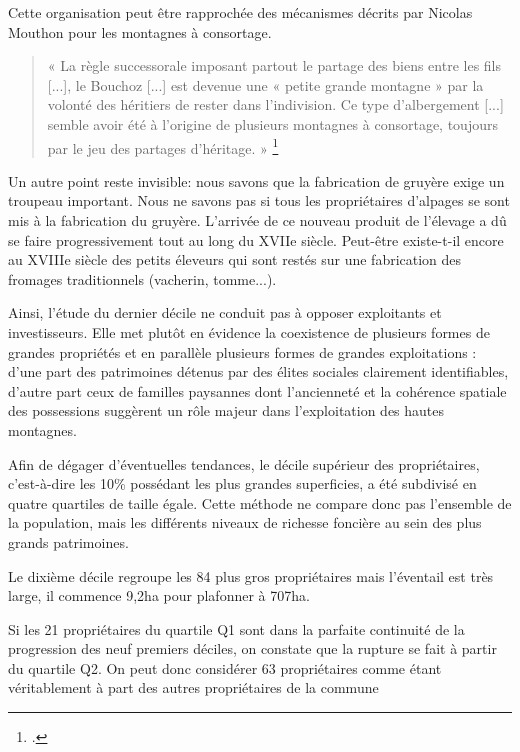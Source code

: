 \documentclass[12pt,a4paper]{report}
\begin{document}
	Cette organisation peut être rapprochée des mécanismes décrits par Nicolas Mouthon pour les montagnes à consortage.
	
	\begin{quote}
		« La règle successorale imposant partout le partage des biens entre les fils [...], le Bouchoz [...] est devenue une « petite grande montagne » par la volonté des héritiers de rester dans l'indivision. Ce type d'albergement [...] semble avoir été à l'origine de plusieurs montagnes à consortage, toujours par le jeu des partages d'héritage. »
		\footcite[120]{Mouthon2019MontagnesMedievales}
	\end{quote}
	
	
	\medskip
	Un autre point reste invisible: nous savons que la fabrication de gruyère exige un troupeau important. Nous ne savons pas si tous les propriétaires d'alpages se sont mis à la fabrication du gruyère. L'arrivée de ce nouveau produit de l'élevage a dû se faire progressivement tout au long du XVIIe siècle. Peut-être existe-t-il encore au XVIIIe siècle des petits éleveurs qui sont restés sur une fabrication des fromages traditionnels (vacherin, tomme...).
	
	\medskip
	Ainsi, l'étude du dernier décile ne conduit pas à opposer exploitants et investisseurs. Elle met plutôt en évidence la coexistence de plusieurs formes de grandes propriétés et en parallèle plusieurs formes de grandes exploitations : d'une part des patrimoines détenus par des élites sociales clairement identifiables, d'autre part ceux de familles paysannes dont l'ancienneté et la cohérence spatiale des possessions suggèrent un rôle majeur dans l'exploitation des hautes montagnes.
	
	\medskip
	Afin de dégager d'éventuelles tendances, le décile supérieur des propriétaires, c'est-à-dire les 10\% possédant les plus grandes superficies, a été subdivisé en quatre quartiles de taille égale. Cette méthode ne compare donc pas l'ensemble de la population, mais les différents niveaux de richesse foncière au sein des plus grands patrimoines. 
	
	\vspace{1em}
	
	Le dixième décile regroupe les 84 plus gros propriétaires mais l'éventail est très large, il commence 9,2ha pour plafonner à 707ha.
	
	Si les 21 propriétaires du quartile Q1 sont dans la parfaite continuité de la progression des neuf premiers déciles, on constate que la rupture se fait à partir du quartile Q2. On peut donc considérer 63 propriétaires comme étant véritablement à part des autres propriétaires de la commune
	
\end{document}
